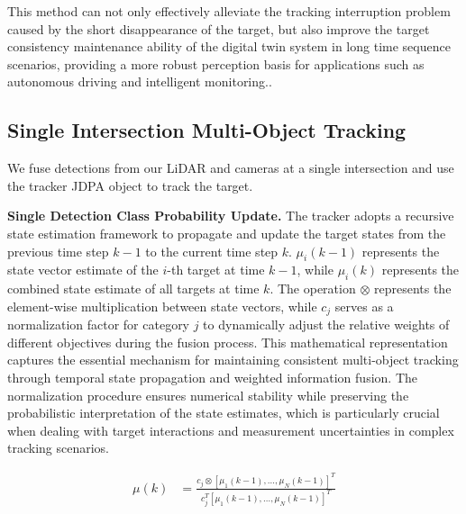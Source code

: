 \documentclass[journal,twoside,web]{ieeecolor}
\begin{document}
This method can not only effectively alleviate the tracking interruption problem caused by the short disappearance of the target, but also improve the target consistency maintenance ability of the digital twin system in long time sequence scenarios, providing a more robust perception basis for applications such as autonomous driving and intelligent monitoring.\cite{Alpher24d}.

\subsection{Single Intersection Multi-Object Tracking}

We fuse detections from our LiDAR and cameras at a single intersection and use the tracker JDPA object to track the target.

\textbf{Single Detection Class Probability Update.}
The tracker adopts a recursive state estimation framework to propagate and update the target states from the previous time step \(k-1\) to the current time step \(k\).
\(\mu_i(k-1)\) represents the state vector estimate of the \(i\)-th target at time \(k-1\), while \(\mu_i(k)\) represents the combined state estimate of all targets at time \(k\).
The operation \(\otimes\) represents the element-wise multiplication between state vectors, while \(c_{j}\) serves as a normalization factor for category \(j\) to dynamically adjust the relative weights of different objectives during the fusion process.
This mathematical representation captures the essential mechanism for maintaining consistent multi-object tracking through temporal state propagation and weighted information fusion.
The normalization procedure ensures numerical stability while preserving the probabilistic interpretation of the state estimates, which is particularly crucial when dealing with target interactions and measurement uncertainties in complex tracking scenarios.

\begin{align}
	\mu(k) & = \frac{c_{j} \otimes [ \mu_1(k-1), \ldots, \mu_N(k-1) ]^T}{c_{j}^{T} [ \mu_1(k-1), \ldots, \mu_N(k-1) ]^T}
\end{align}
\end{document}
